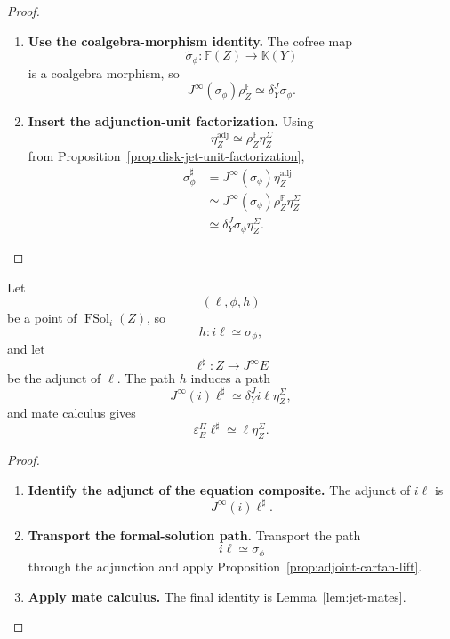 \begin{proof}
\leavevmode
\begin{enumerate}[label=\textup{(\arabic*)}]
    \item \textbf{Use the coalgebra-morphism identity.}
The cofree map
\[
  \widetilde\sigma_\phi:
  \mathbb F(Z)\to\mathbb K(Y)
\]
is a coalgebra morphism, so
\[
  J^\infty(\sigma_\phi)\rho_Z^{\mathbb F}
  \simeq
  \delta^J_Y\sigma_\phi.
\]

    \item \textbf{Insert the adjunction-unit factorization.}
Using
\[
  \eta^{\mathrm{adj}}_Z
  \simeq
  \rho_Z^{\mathbb F}\eta^\Sigma_Z
\]
from
Proposition~\ref{prop:disk-jet-unit-factorization},
\[
\begin{aligned}
  \sigma_\phi^\sharp
  &=
  J^\infty(\sigma_\phi)\eta^{\mathrm{adj}}_Z\\
  &\simeq
  J^\infty(\sigma_\phi)\rho_Z^{\mathbb F}\eta^\Sigma_Z\\
  &\simeq
  \delta^J_Y\sigma_\phi\eta^\Sigma_Z.
\end{aligned}
\]
\end{enumerate}
\end{proof}

\begin{proposition}
\label{prop:adjoint-formal-solution}
Let
\[
  (\ell,\phi,h)
\]
be a point of \(\operatorname{FSol}_i(Z)\), so
\[
  h:
  i\ell\simeq\sigma_\phi,
\]
and let
\[
  \ell^\sharp:
  Z\to J^\infty E
\]
be the adjunct of \(\ell\). The path \(h\) induces a path
\[
  J^\infty(i)\ell^\sharp
  \simeq
  \delta^J_Yi\ell\eta^\Sigma_Z,
\]
and mate calculus gives
\[
  \varepsilon^\Pi_E\ell^\sharp
  \simeq
  \ell\eta^\Sigma_Z.
\]
\end{proposition}

\begin{proof}
\leavevmode
\begin{enumerate}[label=\textup{(\arabic*)}]
    \item \textbf{Identify the adjunct of the equation composite.}
The adjunct of \(i\ell\) is
\[
  J^\infty(i)\ell^\sharp.
\]

    \item \textbf{Transport the formal-solution path.}
Transport the path
\[
  i\ell\simeq\sigma_\phi
\]
through the adjunction and apply
Proposition~\ref{prop:adjoint-cartan-lift}.

    \item \textbf{Apply mate calculus.}
The final identity is
Lemma~\ref{lem:jet-mates}.
\end{enumerate}
\end{proof}

